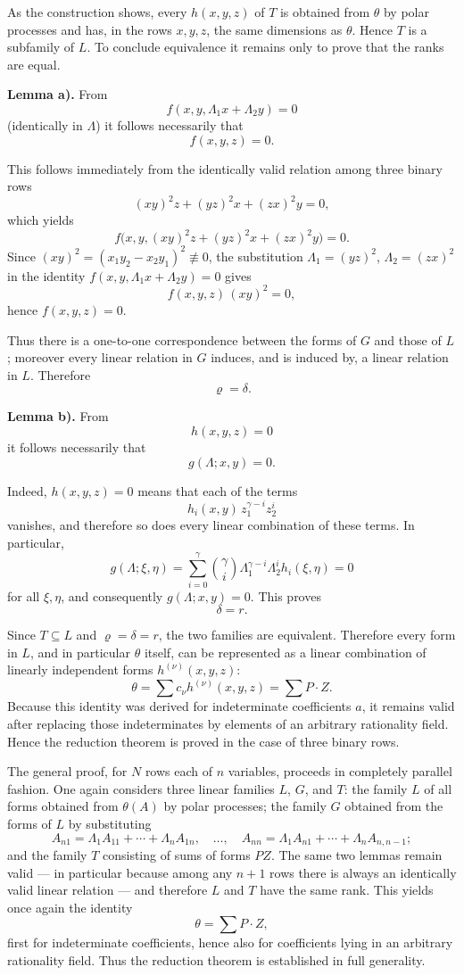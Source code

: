 \documentclass[11pt]{article}
\begin{document}
As the construction shows, every \(h(x,y,z)\) of \(T\) is obtained from \(\theta\) by polar processes and has, in the rows \(x,y,z\), the same dimensions as \(\theta\). Hence \(T\) is a subfamily of \(L\). To conclude equivalence it remains only to prove that the ranks are equal.

\medskip
\noindent\textbf{Lemma a).}
From
\[
f(x,y,\Lambda_1x+\Lambda_2y)=0
\]
(identically in \(\Lambda\)) it follows necessarily that
\[
f(x,y,z)=0.
\]

This follows immediately from the identically valid relation among three binary rows
\[
(xy)^2 z+(yz)^2 x+(zx)^2 y=0,
\]
which yields
\[
f\bigl(x,y,(xy)^2z+(yz)^2x+(zx)^2y\bigr)=0.
\]
Since \((xy)^2=(x_1y_2-x_2y_1)^2\not\equiv 0\), the substitution \(\Lambda_1=(yz)^2\), \(\Lambda_2=(zx)^2\) in the identity \(f(x,y,\Lambda_1x+\Lambda_2y)=0\) gives
\[
f(x,y,z)\,(xy)^2=0,
\]
hence \(f(x,y,z)=0\).

Thus there is a one-to-one correspondence between the forms of \(G\) and those of \(L\); moreover every linear relation in \(G\) induces, and is induced by, a linear relation in \(L\). Therefore
\[
\varrho=\delta.
\]

\medskip
\noindent\textbf{Lemma b).}
From
\[
h(x,y,z)=0
\]
it follows necessarily that
\[
g(\Lambda;x,y)=0.
\]

Indeed, \(h(x,y,z)=0\) means that each of the terms
\[
h_i(x,y)\,z_1^{\gamma-i}z_2^i
\]
vanishes, and therefore so does every linear combination of these terms. In particular,
\[
g(\Lambda;\xi,\eta)=\sum_{i=0}^{\gamma}\binom{\gamma}{i}\Lambda_1^{\gamma-i}\Lambda_2^i h_i(\xi,\eta)=0
\]
for all \(\xi,\eta\), and consequently \(g(\Lambda;x,y)=0\). This proves
\[
\delta=r.
\]

Since \(T\subseteq L\) and \(\varrho=\delta=r\), the two families are equivalent. Therefore every form in \(L\), and in particular \(\theta\) itself, can be represented as a linear combination of linearly independent forms \(h^{(\nu)}(x,y,z)\):
\[
\theta=\sum c_\nu h^{(\nu)}(x,y,z)=\sum P\cdot Z.
\]
Because this identity was derived for indeterminate coefficients \(a\), it remains valid after replacing those indeterminates by elements of an arbitrary rationality field. Hence the reduction theorem is proved in the case of three binary rows.

\medskip
The general proof, for \(N\) rows each of \(n\) variables, proceeds in completely parallel fashion. One again considers three linear families \(L\), \(G\), and \(T\): the family \(L\) of all forms obtained from \(\theta(A)\) by polar processes; the family \(G\) obtained from the forms of \(L\) by substituting
\[
A_{n1}=\Lambda_1A_{11}+\cdots+\Lambda_nA_{1n},\quad \dots,\quad
A_{nn}=\Lambda_1A_{n1}+\cdots+\Lambda_nA_{n,n-1};
\]
and the family \(T\) consisting of sums of forms \(PZ\). The same two lemmas remain valid --- in particular because among any \(n+1\) rows there is always an identically valid linear relation --- and therefore \(L\) and \(T\) have the same rank. This yields once again the identity
\[
\theta=\sum P\cdot Z,
\]
first for indeterminate coefficients, hence also for coefficients lying in an arbitrary rationality field. Thus the reduction theorem is established in full generality.
\end{document}
